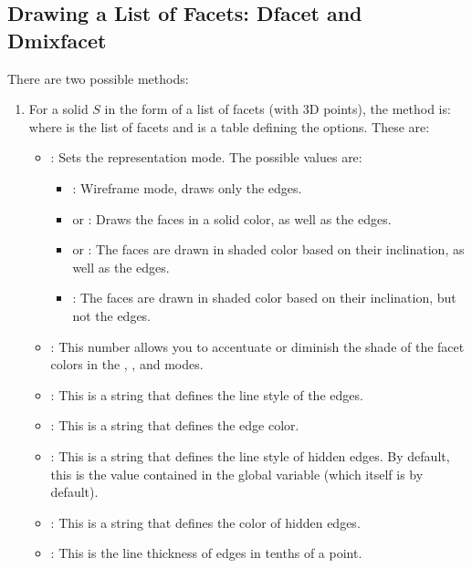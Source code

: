 \subsection{Drawing a List of Facets: Dfacet and Dmixfacet}

There are two possible methods:
\begin{enumerate}
    \item For a solid $S$ in the form of a list of facets (with 3D points), the method is:
where  is the list of facets and  is a table defining the options. These are:
    \begin{itemize}
        \item {}: Sets the representation mode. The possible values are:
            \begin{itemize}
                \item {}: Wireframe mode, draws only the edges.
                \item {} or : Draws the faces in a solid color, as well as the edges.     
                \item {} or : The faces are drawn in shaded color based on their inclination, as well as the edges.
                \item {}: The faces are drawn in shaded color based on their inclination, but not the edges.
            \end{itemize}
        \item {}: This number allows you to accentuate or diminish the shade of the facet colors in the , , and  modes.
        \item {}: This is a string that defines the line style of the edges.
        \item {}: This is a string that defines the edge color.
        \item {}: This is a string that defines the line style of hidden edges. By default, this is the value contained in the global variable  (which itself is  by default).
        \item {}: This is a string that defines the color of hidden edges.
        \item {}: This is the line thickness of edges in tenths of a point.

\end{itemize}
\end{enumerate}
